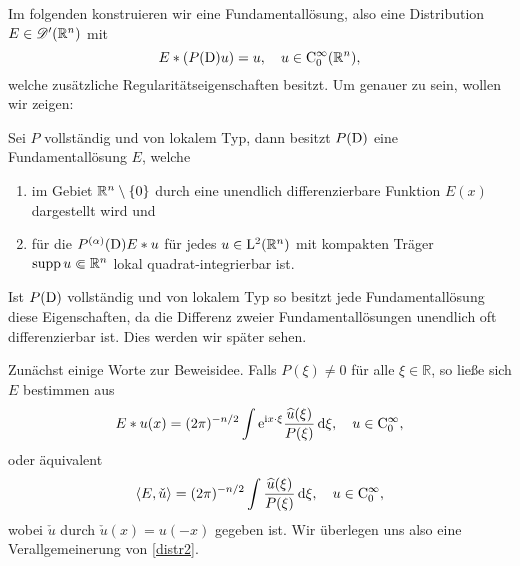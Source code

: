 Im folgenden konstruieren wir eine Fundamentallösung, also eine Distribution $E\in\mathscr D'(\mathbb R^n)$ mit
\begin{equation}
E*(P(\mathrm D) u) = u, \quad u \in \mathrm C_0^\infty(\mathbb R^n),
\end{equation}
welche zusätzliche Regularitätseigenschaften besitzt.
Um genauer zu sein,  wollen wir zeigen:
\begin{thm}\label{fundamental_exist}
Sei $P$ vollständig und von lokalem Typ, dann besitzt $P(\mathrm D)$ eine Fundamentallösung $E$, welche 
\begin{enumerate}
\item im Gebiet $\mathbb R^n\setminus\{0\}$  durch eine unendlich differenzierbare Funktion $E(x)$ dargestellt wird und
\item für die $P^{(\alpha)}(\mathrm D) E*u$ für jedes $u\in \mathrm L^2(\mathbb R^n)$ mit kompakten Träger $\operatorname{supp} u\Subset\mathbb R^n$ lokal quadrat-integrierbar ist. 
\end{enumerate}
\end{thm}
\begin{rem}
Ist $P(\mathrm D)$ vollständig und von lokalem Typ so besitzt jede Fundamentallösung diese Eigenschaften, da die Differenz zweier Fundamentallösungen unendlich oft differenzierbar ist. Dies werden wir später sehen.
\end{rem}

Zunächst einige Worte zur Beweisidee.  Falls $P(\xi)\neq 0$ für alle $\xi\in \mathbb R$, so ließe sich $E$ bestimmen aus
\begin{equation}\label{distr1}
E*u(x) = (2\pi)^{-n/2}\int \mathrm e^{\mathrm i x\cdot \xi} \frac{\widehat u(\xi)}{P(\xi)}\, \mathrm d\xi, \quad u \in \mathrm C_0^\infty,
\end{equation}
oder äquivalent
\begin{equation}\label{distr2}
\langle E,\check u\rangle = (2\pi)^{-n/2} \int \frac{\widehat u(\xi)}{P(\xi)}\, \mathrm d\xi, \quad u \in\mathrm C_0^\infty,
\end{equation}
wobei $\check u$ durch $\check u(x)=u(-x)$ gegeben ist. Wir überlegen uns also eine Verallgemeinerung von \eqref{distr2}. 

